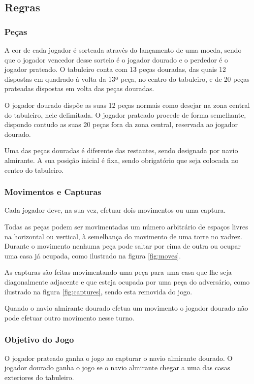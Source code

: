 \documentclass[a4paper]{article}
\begin{document}
\subsection{Regras}
\subsubsection{Peças}
A cor de cada jogador é sorteada através do lançamento de uma moeda, sendo que o jogador vencedor desse sorteio é o jogador dourado e o perdedor é o jogador prateado. O tabuleiro conta com 13 peças douradas, das quais 12 dispostas em quadrado à volta da 13ª peça, no centro do tabuleiro, e de 20 peças prateadas dispostas em volta das peças douradas.

O jogador dourado dispõe as suas 12 peças normais como desejar na zona central do tabuleiro, nele delimitada. O jogador prateado procede de forma semelhante, dispondo contudo as suas 20 peças fora da zona central, reservada ao jogador dourado.

Uma das peças douradas é diferente das restantes, sendo designada por navio almirante. A sua posição inicial é fixa, sendo obrigatório que seja colocada no centro do tabuleiro.

\subsubsection{Movimentos e Capturas}
Cada jogador deve, na sua vez, efetuar dois movimentos ou uma captura. 

Todas as peças podem ser movimentadas um número arbitrário de espaços livres na horizontal ou vertical, à semelhança do movimento de uma torre no xadrez. Durante o movimento nenhuma peça pode saltar por cima de outra ou ocupar uma casa já ocupada, como ilustrado na figura \ref{fig:moves}.

As capturas são feitas movimentando uma peça para uma casa que lhe seja diagonalmente adjacente e que esteja ocupada por uma peça do adversário, como ilustrado na figura \ref{fig:captures}, sendo esta removida do jogo.

Quando o navio almirante dourado efetua um movimento o jogador dourado não pode efetuar outro movimento nesse turno.

\subsubsection{Objetivo do Jogo}
O jogador prateado ganha o jogo ao capturar o navio almirante dourado. O jogador dourado ganha o jogo se o navio almirante chegar a uma das casas exteriores do tabuleiro.
\end{document}
